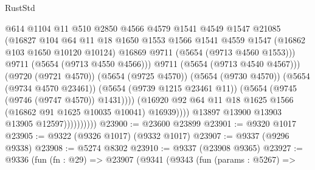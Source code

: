 \begin{lexlean}{RustStd}
\begin{coremodule}
                                      @614
                                      @1104
                                      @11
                                      @510
                                      @2850
                                      @4566
                                      @4579
                                      @1541
                                      @4549
                                      @1547
                                      @21085
                                      (@16827
                                        @104
                                        @64
                                        @11
                                        @18
                                        @1650
                                        @1553
                                        @1566
                                        @1541
                                        @4559
                                        @1547
                                        (@16862 @103 @1650 @10120 @10124)
                                        @16869
                                        @9711
                                        (@5654 (@9713 @4560 @1553)))
                                      @9711
                                      (@5654 (@9713 @4550 @4566)))
                                    @9711
                                    (@5654 (@9713 @4540 @4567)))
                                  (@9720 (@9721 @4570))
                                  (@5654 (@9725 @4570))
                                  (@5654 (@9730 @4570))
                                  (@5654 (@9734 @4570 @23461))
                                  (@5654 (@9739 @1215 @23461 @11))
                                  (@5654 (@9745 (@9746 (@9747 @4570)) @1431))))
                              (@16920
                                @92
                                @64
                                @11
                                @18
                                @1625
                                @1566
                                (@16862 @91 @1625 @10035 @10041)
                                @16939))))
                        @13897
                        @13900
                        @13903
                        @13905
                        @12597))))))))))
@23900 := @23600 @23899
@23901 := @9320 @1017
@23905 := @9322 (@9326 @1017) (@9332 @1017)
@23907 := @9337 (@9296 @9338)
@23908 := @5274 @8302
@23910 := @9337 (@23908 @9365)
@23927 := @9336
    (fun (fn : @29) =>
    @23907
      (@9341
        (@9343
          (fun (params : @5267) =>

\end{coremodule}
\end{lexlean}
